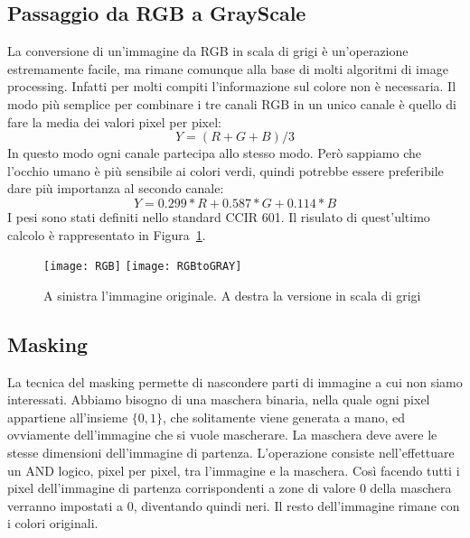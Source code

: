 \subsection {Passaggio da RGB a GrayScale}
La conversione di un'immagine da RGB in scala di grigi è un'operazione estremamente facile, ma rimane comunque alla base di molti algoritmi di image processing.
Infatti per molti compiti l'informazione sul colore non è necessaria.
Il modo più semplice per combinare i tre canali RGB in un unico canale è quello di fare la media dei valori pixel per pixel:
\begin{equation}
  Y = (R + G + B)/3
\end{equation}
\label{eq:rgb2gray_avg}
In questo modo ogni canale partecipa allo stesso modo.
Però sappiamo che l'occhio umano è più sensibile ai colori verdi, quindi potrebbe essere preferibile dare più importanza al secondo canale:
\begin{equation}
  Y = 0.299*R + 0.587*G + 0.114*B
\end{equation}
\label{eq:rgb2gray}
I pesi sono stati definiti nello standard CCIR 601.
Il risulato di quest'ultimo calcolo è rappresentato in Figura~\ref{fig:rgb2gray_example}.

\begin{figure}[ht]
  \begin{center}
    \texttt{[image: RGB]}
    \texttt{[image: RGBtoGRAY]}
    \caption{A sinistra l'immagine originale. A destra la versione in scala di grigi}
    \label{fig:rgb2gray_example}
  \end{center}
\end{figure}


\clearpage
\subsection {Masking}
La tecnica del masking permette di nascondere parti di immagine a cui non siamo interessati.
Abbiamo bisogno di una maschera binaria, nella quale ogni pixel appartiene all'insieme $\{0,1\}$, che solitamente viene generata a mano, ed ovviamente dell'immagine che si vuole mascherare.
La maschera deve avere le stesse dimensioni dell'immagine di partenza.
L'operazione consiste nell'effettuare un AND logico, pixel per pixel,  tra l'immagine e la maschera.
Così facendo tutti i pixel dell'immagine di partenza corrispondenti a zone di valore $0$ della maschera verranno impostati a $0$, diventando quindi neri.
Il resto dell'immagine rimane con i colori originali.

